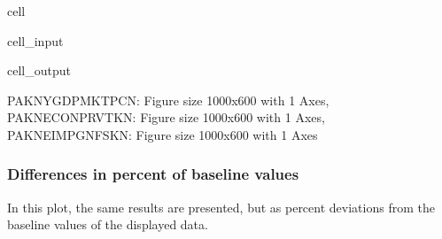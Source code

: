 \documentclass[letterpaper,10pt,english]{jupyterBook}
\begin{document}
\begin{sphinxuseclass}{cell}\begin{sphinxVerbatimInput}

\begin{sphinxuseclass}{cell_input}
\begin{sphinxVerbatim}[commandchars=\\\{\}]
  
\end{sphinxVerbatim}

\end{sphinxuseclass}\end{sphinxVerbatimInput}
\begin{sphinxVerbatimOutput}

\begin{sphinxuseclass}{cell_output}
\begin{sphinxVerbatim}[commandchars=\\\{\}]
\PYGZob{}\PYGZsq{}PAKNYGDPMKTPCN\PYGZsq{}: \PYGZlt{}Figure size 1000x600 with 1 Axes\PYGZgt{},
 \PYGZsq{}PAKNECONPRVTKN\PYGZsq{}: \PYGZlt{}Figure size 1000x600 with 1 Axes\PYGZgt{},
 \PYGZsq{}PAKNEIMPGNFSKN\PYGZsq{}: \PYGZlt{}Figure size 1000x600 with 1 Axes\PYGZgt{}\PYGZcb{}
\end{sphinxVerbatim}

\end{sphinxuseclass}\end{sphinxVerbatimOutput}

\end{sphinxuseclass}

\subsubsection{Differences in percent of baseline values}
\label{\detokenize{content/06_WBModels/ScenarioAnalysis:differences-in-percent-of-baseline-values}}
\sphinxAtStartPar
In this plot, the same results are presented, but as percent deviations from the baseline values of the displayed data.
\end{document}
